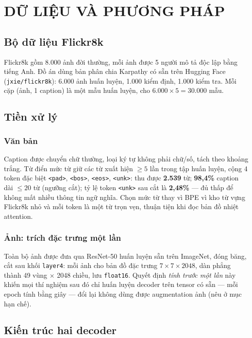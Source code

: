 \chapter{DỮ LIỆU VÀ PHƯƠNG PHÁP}
\label{chap:methods}

\section{Bộ dữ liệu Flickr8k}

Flickr8k \autocite{hodosh2013framing} gồm 8.000 ảnh đời thường, mỗi ảnh được 5
người mô tả độc lập bằng tiếng Anh. Đồ án dùng bản phân chia Karpathy
\autocite{karpathy2015deep} có sẵn trên Hugging Face (\texttt{jxie/flickr8k}):
6.000 ảnh huấn luyện, 1.000 kiểm định, 1.000 kiểm tra. Mỗi cặp (ảnh, 1 caption)
là một mẫu huấn luyện, cho $6.000\times 5 = 30.000$ mẫu.

\section{Tiền xử lý}

\subsection{Văn bản}
Caption được chuyển chữ thường, loại ký tự không phải chữ/số, tách theo khoảng
trắng. Từ điển mức từ giữ các từ xuất hiện $\geq 5$ lần trong tập huấn luyện,
cộng 4 token đặc biệt \texttt{<pad>}, \texttt{<bos>}, \texttt{<eos>},
\texttt{<unk>}: thu được \textbf{2.539} từ; \textbf{98,4\%} caption dài $\leq
20$ từ (ngưỡng cắt); tỷ lệ token \texttt{<unk>} sau cắt là \textbf{2,48\%} ---
đủ thấp để không mất nhiều thông tin ngữ nghĩa. Chọn mức từ thay vì BPE vì kho
từ vựng Flickr8k nhỏ và mỗi token là một từ trọn vẹn, thuận tiện khi đọc bản
đồ nhiệt attention.

\subsection{Ảnh: trích đặc trưng một lần}
Toàn bộ ảnh được đưa qua ResNet-50 \autocite{he2016resnet} huấn luyện sẵn trên
ImageNet, đóng băng, cắt sau khối \texttt{layer4}: mỗi ảnh cho bản đồ đặc trưng
$7\times 7\times 2048$, dàn phẳng thành 49 vùng $\times$ 2048 chiều, lưu
\texttt{float16}. Quyết định \emph{tính trước một lần} này khiến mọi thí nghiệm
sau đó chỉ huấn luyện decoder trên tensor có sẵn --- mỗi epoch tính bằng giây ---
đổi lại không dùng được augmentation ảnh (nêu ở mục hạn chế).

\section{Kiến trúc hai decoder}

